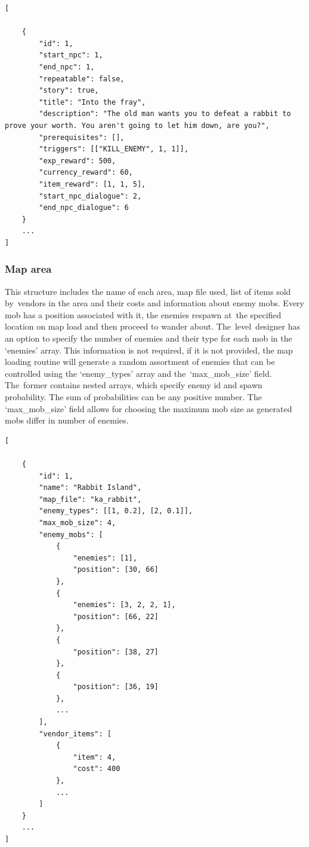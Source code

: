 \documentclass[thesis=B,english,hidelinks]{FITthesisXE}[2012/06/26]
\begin{document}
\begin{lstlisting}
[

    {
        "id": 1,
        "start_npc": 1,
        "end_npc": 1,
        "repeatable": false,
        "story": true,
        "title": "Into the fray",
        "description": "The old man wants you to defeat a rabbit to prove your worth. You aren't going to let him down, are you?",
        "prerequisites": [],
        "triggers": [["KILL_ENEMY", 1, 1]],
        "exp_reward": 500,
        "currency_reward": 60,
        "item_reward": [1, 1, 5],
        "start_npc_dialogue": 2,
        "end_npc_dialogue": 6
    }
    ...
]
\end{lstlisting}

\newpage

\subsubsection{Map area}

This structure includes the name of each area, map file used, list of items sold by~vendors in the area and their costs and information about enemy mobs. Every mob has a position associated with it, the enemies respawn at~the specified location on map load and then proceed to wander about. The~level~designer has an option to specify the number of enemies and their type for each mob in the `enemies' array. This information is not required, if it is not provided, the map loading routine will generate a random assortment of enemies that can be controlled using the `enemy\_types' array and the~`max\_mob\_size' field. The~former contains nested arrays, which specify enemy id and spawn probability. The sum of probabilities can be any positive number. The `max\_mob\_size' field allows for choosing the maximum mob size as generated mobs differ in number of enemies.

\begin{lstlisting}
[

    {
        "id": 1,
        "name": "Rabbit Island",
        "map_file": "ka_rabbit",
        "enemy_types": [[1, 0.2], [2, 0.1]],
        "max_mob_size": 4,
        "enemy_mobs": [
            {
                "enemies": [1],
                "position": [30, 66]
            },
            {
                "enemies": [3, 2, 2, 1],
                "position": [66, 22]
            },
            {
                "position": [38, 27]
            },
 		    {
                "position": [36, 19]
            },
 	        ...
        ],
        "vendor_items": [
            {
                "item": 4,
                "cost": 400
            },
            ...
        ]
    }
    ...
]
\end{lstlisting}
\end{document}
